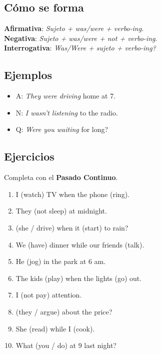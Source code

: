 \documentclass[11pt,a4paper]{article}
\begin{document}
\subsection*{Cómo se forma}
\textbf{Afirmativa}: \emph{Sujeto + was/were + verbo-ing}.\\
\textbf{Negativa}: \emph{Sujeto + was/were + not + verbo-ing}.\\
\textbf{Interrogativa}: \emph{Was/Were + sujeto + verbo-ing?}

\subsection*{Ejemplos}
\begin{itemize}
  \item A: \emph{They were driving} home at 7.
  \item N: \emph{I wasn’t listening} to the radio.
  \item Q: \emph{Were you waiting} for long?
\end{itemize}

\subsection*{Ejercicios}
Completa con el \textbf{Pasado Continuo}.
\begin{enumerate}
  \item I \underline{\hspace{2.5cm}} (watch) TV when the phone \underline{\hspace{2.5cm}} (ring).
  \item They \underline{\hspace{2.5cm}} (not sleep) at midnight.
  \item \underline{\hspace{2.5cm}} (she / drive) when it \underline{\hspace{2.5cm}} (start) to rain?
  \item We \underline{\hspace{2.5cm}} (have) dinner while our friends \underline{\hspace{2.5cm}} (talk).
  \item He \underline{\hspace{2.5cm}} (jog) in the park at 6 am.
  \item The kids \underline{\hspace{2.5cm}} (play) when the lights \underline{\hspace{2.5cm}} (go) out.
  \item I \underline{\hspace{2.5cm}} (not pay) attention.
  \item \underline{\hspace{2.5cm}} (they / argue) about the price?
  \item She \underline{\hspace{2.5cm}} (read) while I \underline{\hspace{2.5cm}} (cook).
  \item What \underline{\hspace{2.5cm}} (you / do) at 9 last night?
\end{enumerate}
\end{document}
